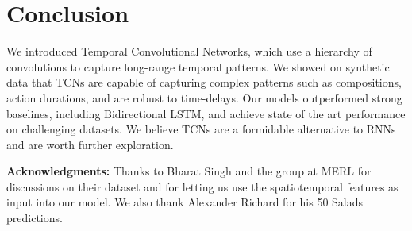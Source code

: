 \documentclass[10pt,twocolumn,letterpaper]{article}
\newcommand{\fakesubsection}[1]{\smallskip\noindent\textbf{#1:}}
\begin{document}
 \section{Conclusion}












We introduced Temporal Convolutional Networks, which use a hierarchy of convolutions to capture long-range temporal patterns. We showed on synthetic data that TCNs are capable of capturing complex patterns such as compositions, action durations, and are robust to time-delays. Our models outperformed strong baselines, including Bidirectional LSTM, and achieve state of the art performance on challenging datasets. 
We believe TCNs are a formidable alternative to RNNs and are worth further exploration. 


































\fakesubsection{Acknowledgments}
Thanks to Bharat Singh and the group at MERL for discussions on their dataset and for letting us use the spatiotemporal features as input into our model. We also thank Alexander Richard for his 50 Salads predictions.








 







\newpage
{\small


}
\end{document}
